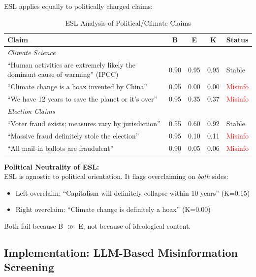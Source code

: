 \documentclass[11pt,a4paper]{article}
\begin{document}
ESL applies equally to politically charged claims:

\begin{table}[H]
\centering
\caption{ESL Analysis of Political/Climate Claims}
\begin{tabular}{p{5.5cm}cccl}
\toprule
\textbf{Claim} & \textbf{B} & \textbf{E} & \textbf{K} & \textbf{Status} \\
\midrule
\multicolumn{5}{l}{\textit{Climate Science}} \\
``Human activities are extremely likely the dominant cause of warming'' (IPCC) & 0.90 & 0.95 & 0.95 & \textcolor{green!60!black}{Stable} \\
``Climate change is a hoax invented by China'' & 0.95 & 0.00 & 0.00 & \textcolor{red}{Misinfo} \\
``We have 12 years to save the planet or it's over'' & 0.95 & 0.35 & 0.37 & \textcolor{red}{Misinfo} \\
\midrule
\multicolumn{5}{l}{\textit{Election Claims}} \\
``Voter fraud exists; measures vary by jurisdiction'' & 0.55 & 0.60 & 0.92 & \textcolor{green!60!black}{Stable} \\
``Massive fraud definitely stole the election'' & 0.95 & 0.10 & 0.11 & \textcolor{red}{Misinfo} \\
``All mail-in ballots are fraudulent'' & 0.90 & 0.05 & 0.06 & \textcolor{red}{Misinfo} \\
\bottomrule
\end{tabular}
\end{table}

\begin{insightbox}
\textbf{Political Neutrality of ESL:} \\
ESL is agnostic to political orientation. It flags overclaiming on \textit{both} sides:
\begin{itemize}
    \item Left overclaim: ``Capitalism will definitely collapse within 10 years'' (K=0.15)
    \item Right overclaim: ``Climate change is definitely a hoax'' (K=0.00)
\end{itemize}
Both fail because B $\gg$ E, not because of ideological content.
\end{insightbox}

\subsection{Implementation: LLM-Based Misinformation Screening}
\end{document}
